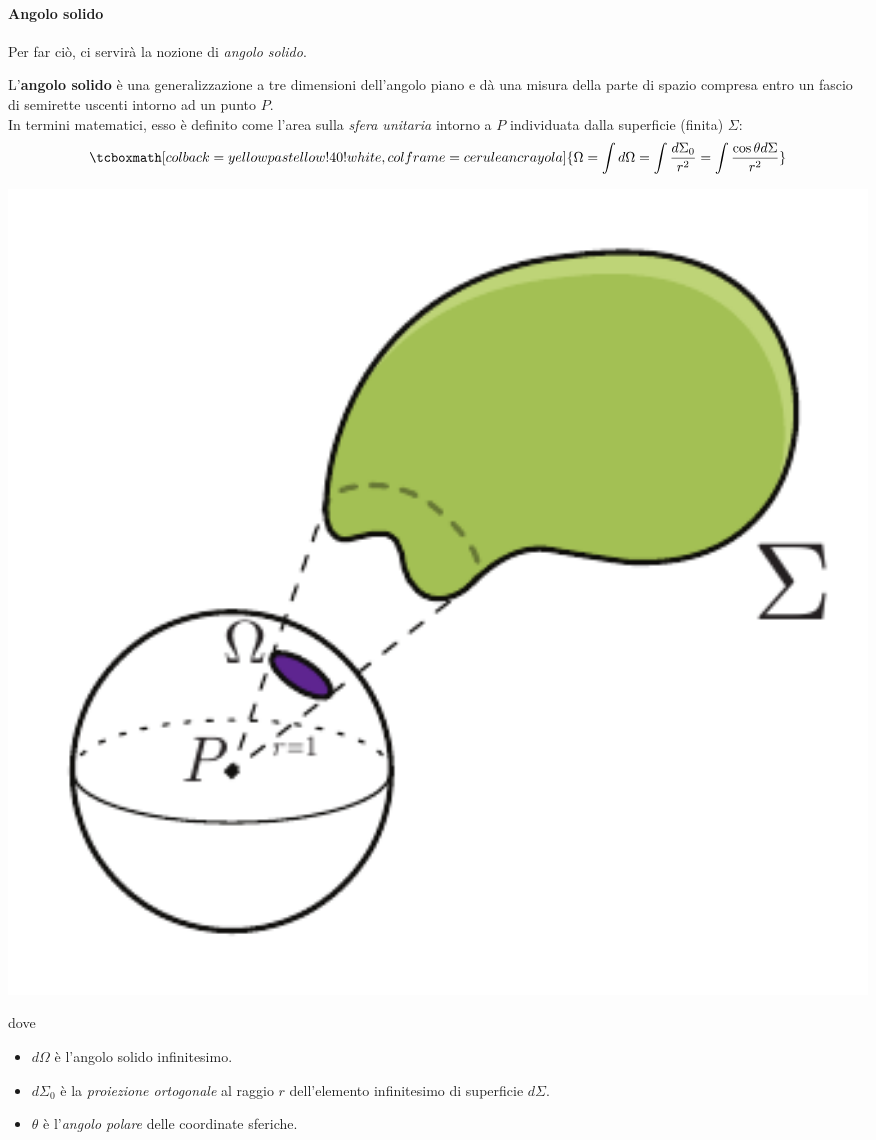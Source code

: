 \paragraph{Angolo solido}
Per far ciò, ci servirà la nozione di \textit{angolo solido}.
\begin{define}%
	\begin{minipage}{0.6\textwidth}
		L'\textbf{angolo solido} è una generalizzazione a tre dimensioni dell'angolo piano e dà una misura della parte di spazio compresa entro un fascio di semirette uscenti intorno ad un punto $P$.\\
		In termini matematici, esso è definito come l'area sulla \textit{sfera unitaria} intorno a $P$ individuata dalla superficie (finita) $\Sigma$:
		\begin{equation}
		\tcboxmath[colback=yellowpastellow!40!white,colframe=ceruleancrayola]{\Omega=\int d\Omega =\int \frac{d\Sigma_0}{r^2}=\int\frac{\cos\theta d\Sigma}{r^2}}
		\end{equation}
	\end{minipage}\hspace{5pt}
	\begin{minipage}{0.39\textwidth}
		\begin{center}
			\includegraphics[width=1\textwidth]{images/chp2angolosolido.pdf}
		\end{center}
	\end{minipage}
dove
\begin{itemize}
	\item $d\Omega$ è l'angolo solido infinitesimo.
	\item $d\Sigma_0$ è la \textit{proiezione ortogonale} al raggio $r$ dell'elemento infinitesimo di superficie $d\Sigma$.
	\item $\theta$ è l'\textit{angolo polare} delle coordinate sferiche.
\end{itemize}
\end{define}
